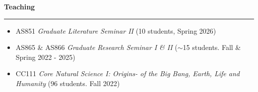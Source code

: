 \documentclass[12pt]{report}
\begin{document}
\noindent \bf{Teaching}\rm \hspace*{\fill} \\
\rule{\textwidth}{1pt}
\begin{itemize} \itemsep -2pt %
	\item AS851 \textit{Graduate Literature Seminar II} (10 students, Spring 2026)
	\item AS865 \& AS866 \textit{ Graduate Research Seminar I \& II}  ($\sim$15 students. Fall \& Spring 2022 - 2025)
	\item CC111 \textit{Core Natural Science I: Origins- of the Big Bang, Earth, Life and Humanity} (96 students. Fall 2022)
 \end{itemize}



   
\end{document}
